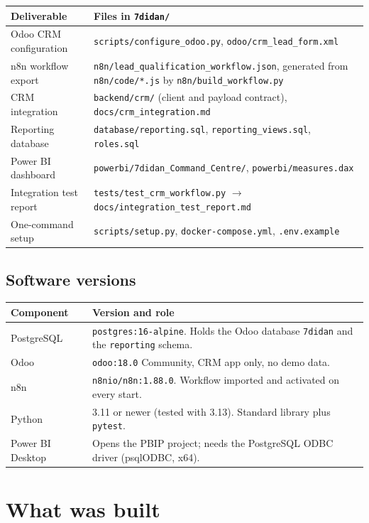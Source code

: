 \documentclass[11pt,a4paper]{article}
\newcommand{\f}[1]{\texttt{#1}}
\begin{document}
\begin{tabularx}{\textwidth}{>{\raggedright\arraybackslash}p{4.3cm}Y}
  \toprule
  \textbf{Deliverable} & \textbf{Files in \f{7didan/}} \\
  \midrule
  Odoo CRM configuration & \f{scripts/configure\_odoo.py}, \f{odoo/crm\_lead\_form.xml} \\
  n8n workflow export & \f{n8n/lead\_qualification\_workflow.json}, generated from \f{n8n/code/*.js} by \f{n8n/build\_workflow.py} \\
  CRM integration & \f{backend/crm/} (client and payload contract), \f{docs/crm\_integration.md} \\
  Reporting database & \f{database/reporting.sql}, \f{reporting\_views.sql}, \f{roles.sql} \\
  Power BI dashboard & \f{powerbi/7didan\_Command\_Centre/}, \f{powerbi/measures.dax} \\
  Integration test report & \f{tests/test\_crm\_workflow.py} $\rightarrow$ \f{docs/integration\_test\_report.md} \\
  One-command setup & \f{scripts/setup.py}, \f{docker-compose.yml}, \f{.env.example} \\
  \bottomrule
\end{tabularx}

\subsection{Software versions}

\begin{tabularx}{\textwidth}{lY}
  \toprule
  \textbf{Component} & \textbf{Version and role} \\
  \midrule
  PostgreSQL & \f{postgres:16-alpine}. Holds the Odoo database \f{7didan} and the \f{reporting} schema. \\
  Odoo & \f{odoo:18.0} Community, CRM app only, no demo data. \\
  n8n & \f{n8nio/n8n:1.88.0}. Workflow imported and activated on every start. \\
  Python & 3.11 or newer (tested with 3.13). Standard library plus \f{pytest}. \\
  Power BI Desktop & Opens the PBIP project; needs the PostgreSQL ODBC driver (psqlODBC, x64). \\
  \bottomrule
\end{tabularx}

\section{What was built}
\end{document}
